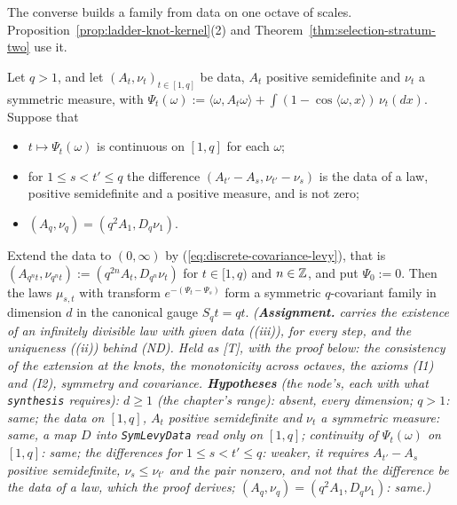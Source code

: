 The converse builds a family from data on one octave of scales.
Proposition~\ref{prop:ladder-knot-kernel}(2) and Theorem~\ref{thm:selection-stratum-two} use it.

\begin{lemma}[synthesis]
\label{lem:synthesis}
\leanok
{}
Let $q > 1$, and let $(A_t, \nu_t)_{t \in [1,q]}$ be \Levy{} data, $A_t$ positive semidefinite and
$\nu_t$ a symmetric \Levy{} measure, with
$\Psi_t(\omega) := \langle\omega, A_t\omega\rangle + \int(1 - \cos\langle\omega, x\rangle)\,\nu_t(dx)$.
Suppose that
\begin{itemize}
\item $t \mapsto \Psi_t(\omega)$ is continuous on $[1,q]$ for each $\omega$;
\item for $1 \le s < t' \le q$ the difference $(A_{t'} - A_s, \nu_{t'} - \nu_s)$ is the data of a law,
positive semidefinite and a positive measure, and is not zero;
\item $(A_q, \nu_q) = (q^2A_1, D_q\nu_1)$.
\end{itemize}
Extend the data to $(0,\infty)$ by (\ref{eq:discrete-covariance-levy}), that is
$(A_{q^nt}, \nu_{q^nt}) := (q^{2n}A_t, D_{q^n}\nu_t)$ for $t \in [1, q)$ and $n \in \mathbb{Z}$, and put
$\Psi_0 := 0$. Then the laws $\mu_{s,t}$ with transform $e^{-(\Psi_t - \Psi_s)}$ form a symmetric
$q$-covariant family in dimension $d$ in the canonical gauge $S_qt = qt$.
\statusA\quad{}\quad\emph{(\textbf{Assignment.}  carries the existence of an
infinitely divisible law with given data ((iii)), for every step, and the uniqueness ((ii)) behind
(ND). Held as [T], with the proof below: the consistency of the extension at the knots, the
monotonicity across octaves, the axioms (I1) and (I2), symmetry and covariance.
\textbf{Hypotheses} (the node's, each with what \texttt{synthesis} requires): $d \ge 1$ (the
chapter's range): absent, every dimension; $q > 1$: same; the data on $[1,q]$, $A_t$ positive
semidefinite and $\nu_t$ a symmetric \Levy{} measure: same, a map $D$ into \texttt{SymLevyData}
read only on $[1,q]$; continuity of $\Psi_t(\omega)$ on $[1,q]$: same; the differences for
$1 \le s < t' \le q$: weaker, it requires $A_{t'} - A_s$ positive semidefinite, $\nu_s \le \nu_{t'}$
and the pair nonzero, and not that the difference be the data of a law, which the proof derives;
$(A_q, \nu_q) = (q^2A_1, D_q\nu_1)$: same.)}
\end{lemma}

